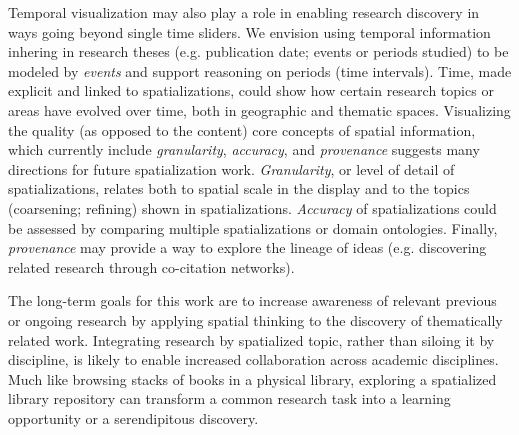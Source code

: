 \documentclass[a4paper,UKenglish]{lipics-v2018}
\begin{document}
Temporal visualization may also play a role in enabling research discovery in ways going beyond single time sliders. We envision using temporal information inhering in research theses (e.g. publication date; events or periods studied) to be modeled by \textit{events} and support reasoning on periods (time intervals). 
Time, made explicit and linked to spatializations, could show how certain research topics or areas have evolved over time, both in geographic and thematic spaces. Visualizing the quality (as opposed to the content) core concepts of spatial information, which currently include \textit{granularity}, \textit{accuracy}, and \textit{provenance} \cite{Kuhn2012e} suggests many directions for future spatialization work. \textit{Granularity}, or level of detail of spatializations, relates both to spatial scale in the display and to the topics (coarsening; refining) shown in spatializations. \textit{Accuracy} of spatializations could be assessed by comparing multiple spatializations or domain ontologies. Finally, \textit{provenance} may provide a way to explore the lineage of ideas (e.g. discovering related research through co-citation networks).

The long-term goals for this work are to increase awareness of relevant previous or ongoing research by applying spatial thinking to the discovery of thematically related work. Integrating research by spatialized topic, rather than siloing it by discipline, is likely to enable increased collaboration across academic disciplines. Much like browsing stacks of books in a physical library, exploring a spatialized library repository can transform a common research task into a learning opportunity or a serendipitous discovery. 





\end{document}
